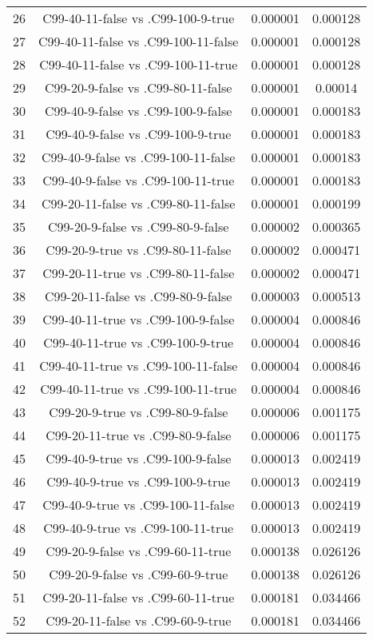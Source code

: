 \documentclass[a4paper,10pt]{article}
\begin{document}
\begin{landscape}
\begin{table}[!htp]
\begin{tabular}{cccc}
26&C99-40-11-false vs .C99-100-9-true&0.000001&0.000128\\
27&C99-40-11-false vs .C99-100-11-false&0.000001&0.000128\\
28&C99-40-11-false vs .C99-100-11-true&0.000001&0.000128\\
29&C99-20-9-false vs .C99-80-11-false&0.000001&0.00014\\
30&C99-40-9-false vs .C99-100-9-false&0.000001&0.000183\\
31&C99-40-9-false vs .C99-100-9-true&0.000001&0.000183\\
32&C99-40-9-false vs .C99-100-11-false&0.000001&0.000183\\
33&C99-40-9-false vs .C99-100-11-true&0.000001&0.000183\\
34&C99-20-11-false vs .C99-80-11-false&0.000001&0.000199\\
35&C99-20-9-false vs .C99-80-9-false&0.000002&0.000365\\
36&C99-20-9-true vs .C99-80-11-false&0.000002&0.000471\\
37&C99-20-11-true vs .C99-80-11-false&0.000002&0.000471\\
38&C99-20-11-false vs .C99-80-9-false&0.000003&0.000513\\
39&C99-40-11-true vs .C99-100-9-false&0.000004&0.000846\\
40&C99-40-11-true vs .C99-100-9-true&0.000004&0.000846\\
41&C99-40-11-true vs .C99-100-11-false&0.000004&0.000846\\
42&C99-40-11-true vs .C99-100-11-true&0.000004&0.000846\\
43&C99-20-9-true vs .C99-80-9-false&0.000006&0.001175\\
44&C99-20-11-true vs .C99-80-9-false&0.000006&0.001175\\
45&C99-40-9-true vs .C99-100-9-false&0.000013&0.002419\\
46&C99-40-9-true vs .C99-100-9-true&0.000013&0.002419\\
47&C99-40-9-true vs .C99-100-11-false&0.000013&0.002419\\
48&C99-40-9-true vs .C99-100-11-true&0.000013&0.002419\\
49&C99-20-9-false vs .C99-60-11-true&0.000138&0.026126\\
50&C99-20-9-false vs .C99-60-9-true&0.000138&0.026126\\
51&C99-20-11-false vs .C99-60-11-true&0.000181&0.034466\\
52&C99-20-11-false vs .C99-60-9-true&0.000181&0.034466\\

\end{tabular}
\end{table}
\end{landscape}
\end{document}
